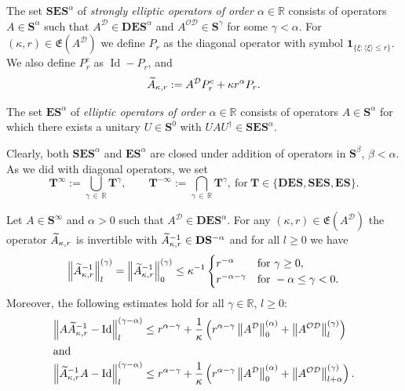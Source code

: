 \documentclass[AHL,Unicode,longabstracts,published]{cedram}
\DeclareMathOperator{\Id}{Id}
\newcommand{\R}{\mathbb R}
\newcommand{\CD}{\mathcal{D}}
\newcommand{\CO}{\mathcal{O}}
\newcommand{\bone}{\boldsymbol 1}
\newcommand{\BD}{\mathbf D}
\newcommand{\BE}{\mathbf E}
\newcommand{\BS}{\mathbf S}
\newcommand{\BT}{\mathbf T}
\newcommand{\FE}{\mathfrak{E}}
\newcommand{\snorm}[3]{\left\| #1\right\|_{#3}^{(#2)}}
\newcommand{\ang}[1]{\langle #1 \rangle}
\newcommand{\er}{r}
\let\oldtilde\tilde
\renewcommand*{\tilde}[1]{\mathchoice{\widetilde{#1}}{\widetilde{#1}}{\oldtilde{#1}}{\oldtilde{#1}}}
\begin{document}
\begin{defi}\label{def:ES}
The set $\BS\BE\BS^\alpha$ of \emph{strongly elliptic operators of order $\alpha\in\R$} consists of operators $A\in\BS^\alpha$ such that $A^\CD \in \BD\BE\BS^\alpha$ and $A^{\CO\CD} \in
\BS^\gamma$ for some $\gamma < \alpha$. For $(\kappa,\er)\in \FE(A^\CD)$ we define $P_\er$ as the diagonal operator with symbol $\bone_{\{\xi: \ang{\xi}\leq
\er\}}$. We also define $P_\er^c$ as $\Id - P_\er$, and
\begin{equation}\label{eq:tilde A}
\tilde A_{\kappa,\er} := A^\CD P_\er^c + \kappa \er^\alpha P_\er.
\end{equation}
\end{defi}

\begin{defi}\label{def:WES}
The set $\BE\BS^\alpha$ of \emph{elliptic operators of order $\alpha\in\R$} consists of operators $A\in\BS^\alpha$ for which there exists a unitary $U\in\BS^0$ with $U A U^\dagger\in\BS\BE\BS^\alpha$.
\end{defi}

Clearly, both $\BS\BE\BS^\alpha$ and $\BE\BS^\alpha$ are closed under addition of operators in $\BS^\beta$, $\beta < \alpha$. As we did with diagonal operators, we set
\begin{equation}
\BT^\infty:=\bigcup\limits_{\gamma\,\in\,\R}\BT^\gamma, \qquad \BT^{-\infty}:=\bigcap\limits_{\gamma\,\in\,\R}\BT^\gamma, \ \text{for} \ \BT\in \lbrace \BD\BE\BS, \BS\BE\BS, \BE\BS \rbrace.
\end{equation}

\begin{prop}\label{prop:globell}
Let $A\in\BS^\infty$ and $\alpha >0$ such that $A^{\CD}\in\BD\BE\BS^\alpha$. For any $(\kappa, \er)\in\FE(A^\CD)$ the operator $\tilde A_{\kappa,\er}$ is invertible with $\tilde A_{\kappa,\er}^{-1}\in\BD\BS^{-\alpha}$ and for all $l \ge 0$ we have
\begin{equation}\label{eq:globinvsnorm}
\snorm{\tilde A_{\kappa,\er}^{-1}}{\gamma}{l} =\snorm{\tilde A_{\kappa,\er}^{-1}}{\gamma}{0} \leq \kappa^{-1}
\begin{cases}
\er^{-\alpha} &\text{for } \gamma \geq 0,\\ \er^{-\alpha -\gamma} &\text{for }-\alpha \leq
\gamma < 0.
\end{cases}
\end{equation}
Moreover, the following estimates hold for all $\gamma \in\R$, $l\geq 0$:
\begin{align}
\snorm{A \tilde A_{\kappa,\er}^{-1} - \Id}{\gamma - \alpha}{l} &\le
\er^{\alpha -\gamma} + \frac 1 \kappa \left(
\er^{\alpha - \gamma} \snorm{A^\CD}{\alpha}{0} +
\snorm{A^{\CO\CD}}{\gamma}{l}
\right)\label{eq:AA_R -Id}
\\
\intertext{and}
\snorm{\tilde A_{\kappa,\er}^{-1} A - \Id}{\gamma - \alpha}{l} &\le
\er^{\alpha -\gamma} + \frac 1 \kappa \left(
\er^{\alpha - \gamma} \snorm{A^\CD}{\alpha}{0} +
\snorm{A^{\CO\CD}}{\gamma}{l+\alpha}
\right).\label{eq:A_RA -Id}
\end{align}
\end{prop}
\end{document}
